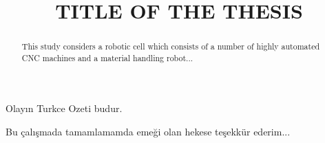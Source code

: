 \documentclass{etutez}
\title{TITLE OF THE THESIS}
\institute{Institute of Natural and Applied Sciences}
\begin{document}
\titlepageMS   %
\signaturepageMS  %
\tezbildirimsayfasi    %


\begin{ozet}
 Olay{\i}n Turkce Ozeti budur.
\end{ozet}



\begin{abstract}
This study considers a robotic cell which consists of a number of highly automated CNC machines and a material handling robot...
\end{abstract}


\begin{tesekkur}
 Bu \c{c}al{\i}\c{s}mada tamamlamamda eme\u{g}i olan hekese te\c{s}ekk\"ur ederim...
\end{tesekkur}



\pagestyle{plain}




\makeatother
\end{document}
